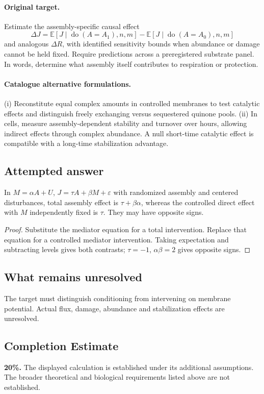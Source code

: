 \documentclass[11pt]{article}
\begin{document}
\paragraph{Original target.}
Estimate the assembly-specific causal effect
\[
\Delta J=\mathbb{E}[J\mid\operatorname{do}(A=A_1),n,m]-\mathbb{E}[J\mid\operatorname{do}(A=A_0),n,m]
\]
and analogous $\Delta R$, with identified sensitivity bounds when abundance or damage cannot be held fixed. Require predictions across a preregistered substrate panel. In words, determine what assembly itself contributes to respiration or protection.
\paragraph{Catalogue alternative formulations.}
(i) Reconstitute equal complex amounts in controlled membranes to test catalytic effects and distinguish freely exchanging versus sequestered quinone pools. (ii) In cells, measure assembly-dependent stability and turnover over hours, allowing indirect effects through complex abundance. A null short-time catalytic effect is compatible with a long-time stabilization advantage.
\subsection{Attempted answer}
\begin{proposition}
In $M=\alpha A+U$, $J=\tau A+\beta M+\varepsilon$ with randomized assembly and centered disturbances, total assembly effect is $\tau+\beta\alpha$, whereas the controlled direct effect with $M$ independently fixed is $\tau$. They may have opposite signs.
\end{proposition}
\begin{proof}
Substitute the mediator equation for a total intervention. Replace that equation for a controlled mediator intervention. Taking expectation and subtracting levels gives both contrasts; $\tau=-1$, $\alpha\beta=2$ gives opposite signs.
\end{proof}
\subsection{What remains unresolved}
The target must distinguish conditioning from intervening on membrane potential. Actual flux, damage, abundance and stabilization effects are unresolved.
\subsection{Completion Estimate}
\textbf{20\%.} The displayed calculation is established under its additional assumptions. The broader theoretical and biological requirements listed above are not established.
\end{document}
